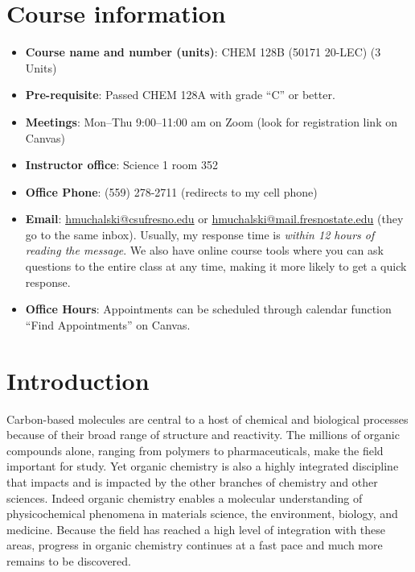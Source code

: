 \hypertarget{course-information}{%
\section{Course information}\label{course-information}}

\begin{itemize}
\tightlist
\item
  \textbf{Course name and number (units)}: CHEM 128B (50171 20-LEC) (3
  Units)
\item
  \textbf{Pre-requisite}: Passed CHEM 128A with grade ``C'' or better.
\item
  \textbf{Meetings}: Mon--Thu 9:00--11:00 am on Zoom (look for
  registration link on Canvas)
\item
  \textbf{Instructor office}: Science 1 room 352
\item
  \textbf{Office Phone}: (559) 278-2711 (redirects to my cell phone)
\item
  \textbf{Email}: \url{hmuchalski@csufresno.edu} or
  \url{hmuchalski@mail.fresnostate.edu} (they go to the same inbox).
  Usually, my response time is \emph{within 12 hours of reading the
  message}. We also have online course tools where you can ask questions
  to the entire class at any time, making it more likely to get a quick
  response.
\item
  \textbf{Office Hours}: Appointments can be scheduled through calendar
  function ``Find Appointments'' on Canvas.
\end{itemize}

\hypertarget{introduction}{%
\section{Introduction}\label{introduction}}

Carbon-based molecules are central to a host of chemical and biological
processes because of their broad range of structure and reactivity. The
millions of organic compounds alone, ranging from polymers to
pharmaceuticals, make the field important for study. Yet organic
chemistry is also a highly integrated discipline that impacts and is
impacted by the other branches of chemistry and other sciences. Indeed
organic chemistry enables a molecular understanding of physicochemical
phenomena in materials science, the environment, biology, and medicine.
Because the field has reached a high level of integration with these
areas, progress in organic chemistry continues at a fast pace and much
more remains to be discovered.

